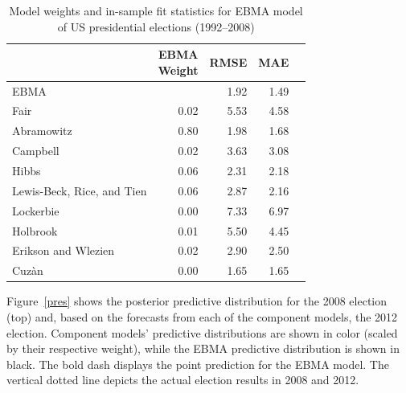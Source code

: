\documentclass[12pt,fullpage,endnotes]{article}
\begin{document}
\begin{table}[ht]
\caption{Model weights and in-sample fit statistics for EBMA model of US presidential elections (1992--2008)}
\label{presModel}
\begin{center}
\begin{tabular}{lrrrr}
  \toprule
 & \shortstack{EBMA\\ Weight}&RMSE &MAE \\ 
  \midrule
  EBMA &  & 1.92 & 1.49 \\ 
  Fair & 0.02 & 5.53 & 4.58 \\ 
  Abramowitz & 0.80 & 1.98 & 1.68 \\ 
  Campbell & 0.02 & 3.63 & 3.08 \\ 
  Hibbs & 0.06 & 2.31 & 2.18 \\ 
  Lewis-Beck, Rice, and Tien  & 0.06 & 2.87 & 2.16 \\ 
  Lockerbie & 0.00 & 7.33 & 6.97 \\ 
  Holbrook & 0.01 & 5.50 & 4.45 \\ 
  Erikson and Wlezien  & 0.02 & 2.90 & 2.50 \\ 
  Cuz\`an	 & 0.00 & 1.65 & 1.65 \\ 
  
   \bottomrule
\end{tabular}
\end{center}
\end{table}


Figure~\ref{pres} shows the posterior predictive distribution for the
2008 election (top) and, based on the forecasts from each of the
component models, the 2012 election.  Component models' predictive
distributions are shown in color (scaled by their respective weight),
while the EBMA predictive distribution is shown in black.  The bold
dash displays the point prediction for the EBMA model. The vertical
dotted line depicts the actual election results in 2008 and 2012.
\end{document}

